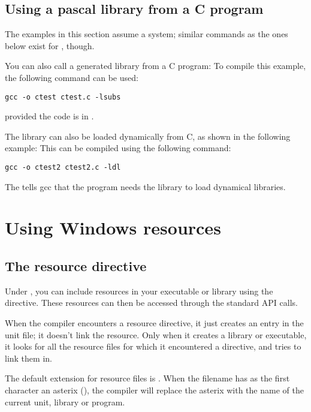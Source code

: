 \section{Using a pascal library from a C program}

\begin{remark}The examples in this section assume a \linux system; similar commands
as the ones below exist for \windows, though.
\end{remark}

You can also call a \fpc generated library from a C program:
To compile this example, the following command can be used:
\begin{verbatim}
gcc -o ctest ctest.c -lsubs
\end{verbatim}
provided the code is in .

The library can also be loaded dynamically from C, as shown in the following
example:
This can be compiled using the following command:
\begin{verbatim}
gcc -o ctest2 ctest2.c -ldl
\end{verbatim}
\lstset{language=delphi}
The  tells gcc that the program needs the  library
to load dynamical libraries.



\chapter{Using Windows resources}
\label{ch:windres}

\section{The resource directive }

Under \windows, you can include resources in your executable or library
using the  directive. These resources can then
be accessed through the standard \windows API calls.

When the compiler encounters a resource directive, it just creates an
entry in the unit  file; it doesn't link the resource. Only
when it creates a library or executable, it looks for all the resource
files for which it encountered a directive, and tries to link them in.

The default extension for resource files is . When the
filename has as the first character an asterix (\var{*}), the
compiler will replace the asterix with the name of the current unit,
library or program.

